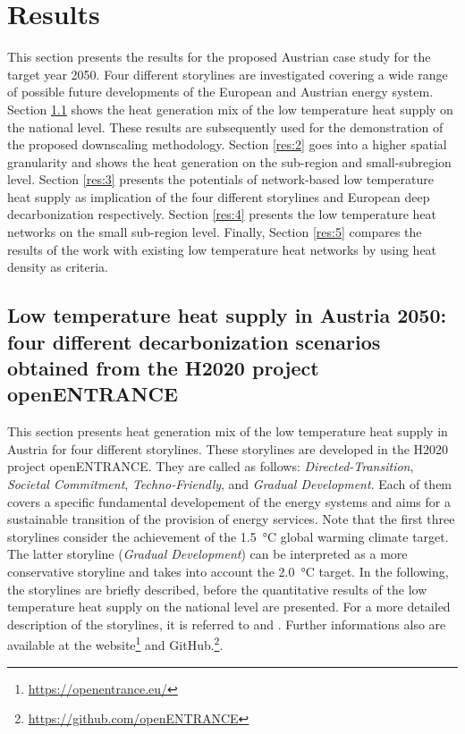 \section{Results}
This section presents the results for the proposed Austrian case study for the target year 2050. Four different storylines are investigated covering a wide range of possible future developments of the European and Austrian energy system. Section \ref{res:1} shows the heat generation mix of the low temperature heat supply on the national level. These results are subsequently used for the demonstration of the proposed downscaling methodology. Section \ref{res:2} goes into a higher spatial granularity and shows the heat generation on the sub-region and small-subregion level. Section \ref{res:3} presents the potentials of network-based low temperature heat supply as implication of the four different storylines and European deep decarbonization respectively. Section \ref{res:4} presents the low temperature heat networks on the small sub-region level. Finally, Section \ref{res:5} compares the results of the work with existing low temperature heat networks by using heat density as criteria.

\subsection{Low temperature heat supply in Austria 2050: four different decarbonization scenarios obtained from the H2020 project openENTRANCE}\label{res:1}
This section presents heat generation mix of the low temperature heat supply in Austria for four different storylines. These storylines are developed in the H2020 project openENTRANCE. They are called as follows: \textit{Directed-Transition}, \textit{Societal Commitment}, \textit{Techno-Friendly}, and \textit{Gradual Development}. Each of them covers a specific fundamental developement of the energy systems and aims for a sustainable transition of the provision of energy services. Note that the first three storylines consider the achievement of the \SI{1.5}{\degreeCelsius} global warming climate target. The latter storyline (\textit{Gradual Development}) can be interpreted as a more conservative storyline and takes into account the \SI{2.0}{\degreeCelsius} target. In the following, the storylines are briefly described, before the quantitative results of the low temperature heat supply on the national level are presented. For a more detailed description of the storylines, it is referred to \cite{auer2020quantitative} and \cite{auer2020development}. Further informations also are available at the website\footnote{\url{https://openentrance.eu/}} and GitHub.\footnote{\url{https://github.com/openENTRANCE}}.\newline

